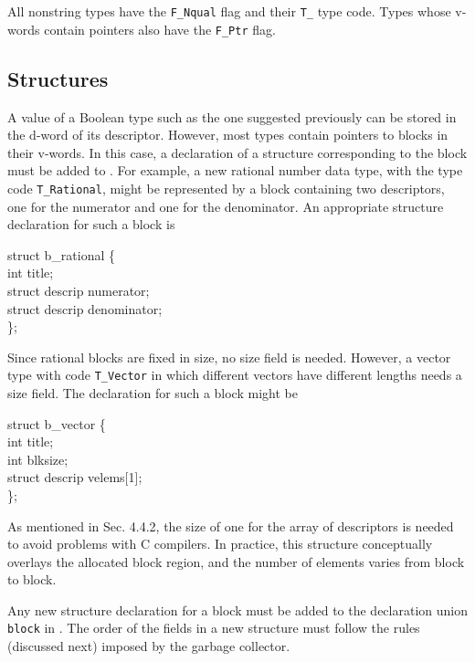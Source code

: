 
\noindent
All nonstring types have the \texttt{F\_Nqual} flag and their \texttt{T\_}
type code. Types whose v-words contain pointers also have the
\texttt{F\_Ptr} flag.

\subsection{Structures}

A value of a Boolean type such as the one suggested previously can be
stored in the d-word of its descriptor. However, most types contain
pointers to blocks in their v-words. In this case, a declaration of a
structure corresponding to the block must be added to .
For example, a new rational number data type, with the type code
\texttt{T\_Rational}, might be represented by a block containing two
descriptors, one for the numerator and one for the denominator. An
appropriate structure declaration for such a block is

\goodbreak
\begin{iconcode}
struct b\_rational \{\\
\>int title;\\
\>struct descrip numerator;\\
\>struct descrip denominator;\\
\};
\end{iconcode}

Since rational blocks are fixed in size, no size field is needed. However,
a vector type with code \texttt{T\_Vector} in which different vectors have
different lengths needs a size field. The declaration for such a block
might be

\goodbreak
\begin{iconcode}
struct b\_vector \{\\
\>int title;\\
\>int blksize;\\
\>struct descrip velems[1];\\
\};
\end{iconcode}

\noindent
As mentioned in Sec. 4.4.2, the size of one for the array of
descriptors is needed to avoid problems with C compilers.  In
practice, this structure conceptually overlays the allocated block
region, and the number of elements varies from block to block.

Any new structure declaration for a block must be added to the declaration
union \texttt{block} in . The order of the fields in a
new structure must follow the rules (discussed next) imposed by the garbage
collector.

